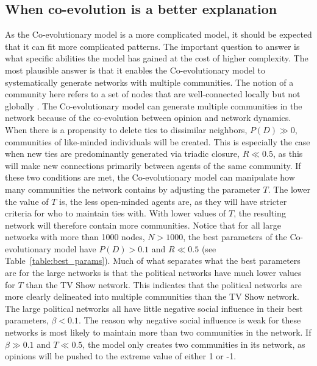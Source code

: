 \documentclass[11pt]{article}
\begin{document}
\subsection{When co-evolution is a better explanation}
As the Co-evolutionary model is a more complicated model, it should be expected that it can fit more complicated patterns. The important question to answer is what specific abilities the model has gained at the cost of higher complexity.
The most plausible answer is that it enables the Co-evolutionary model to systematically generate networks with multiple communities. The notion of a community here refers to a set of nodes that are well-connected locally but not globally \cite{yang2011detecting}. The Co-evolutionary model can generate multiple communities in the network because of the co-evolution between opinion and network dynamics. 
When there is a propensity to delete ties to dissimilar neighbors, $P(D) \gg 0$, communities of like-minded individuals will be created. This is especially the case when new ties are predominantly generated via triadic closure, $R \ll 0.5$, as this will make new connections primarily between agents of the same community. 
If these two conditions are met, the Co-evolutionary model can manipulate how many communities the network contains by adjusting the parameter $T$. 
The lower the value of $T$ is, the less open-minded agents are, as they will have stricter criteria for who to maintain ties with. With lower values of $T$, the resulting network will therefore contain more communities. Notice that for all large networks with more than 1000 nodes, $N > 1000$, the best parameters of the Co-evolutionary model have $P(D) > 0.1$ and $R \ll 0.5$ (see Table~\ref{table:best_params}). Much of what separates what the best parameters are for the large networks is that the political networks have much lower values for $T$ than the TV Show network. This indicates that the political networks are more clearly delineated into multiple communities than the TV Show network. The large political networks all have little negative social influence in their best parameters, $\beta < 0.1$. The reason why negative social influence is weak for these networks is most likely to maintain more than two communities in the network. If $\beta \gg 0.1$ and $T \ll 0.5$, the model only creates two communities in its network, as opinions will be pushed to the extreme value of either 1 or -1. 
\end{document}
